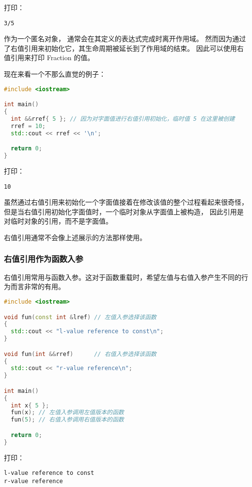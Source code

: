\documentclass[../../LearnCpp.tex]{subfiles}
\begin{document}
打印：

\begin{lstlisting}
3/5
\end{lstlisting}

作为一个匿名对象， 通常会在其定义的表达式完成时离开作用域。
然而因为通过了右值引用来初始化它，其生命周期被延长到了作用域的结束。
因此可以使用右值引用来打印 Fraction 的值。

现在来看一个不那么直觉的例子：

\begin{lstlisting}[language=C++]
#include <iostream>

int main()
{
  int &&rref{ 5 }; // 因为对字面值进行右值引用初始化，临时值 5 在这里被创建
  rref = 10;
  std::cout << rref << '\n';

  return 0;
}
\end{lstlisting}

打印：

\begin{lstlisting}
10
\end{lstlisting}

虽然通过右值引用来初始化一个字面值接着在修改该值的整个过程看起来很奇怪，
但是当右值引用初始化字面值时，一个临时对象从字面值上被构造，
因此引用是对临时对象的引用，而不是字面值。

右值引用通常不会像上述展示的方法那样使用。

\subsubsection*{右值引用作为函数入参}

右值引用常用与函数入参。这对于函数重载时，希望左值与右值入参产生不同的行为而言非常的有用。

\begin{lstlisting}[language=C++]
#include <iostream>

void fun(const int &lref) // 左值入参选择该函数
{
  std::cout << "l-value reference to const\n";
}

void fun(int &&rref)      // 右值入参选择该函数
{
  std::cout << "r-value reference\n";
}

int main()
{
  int x{ 5 };
  fun(x); // 左值入参调用左值版本的函数
  fun(5); // 右值入参调用右值版本的函数

  return 0;
}
\end{lstlisting}

打印：

\begin{lstlisting}
l-value reference to const
r-value reference
\end{lstlisting}
\end{document}
